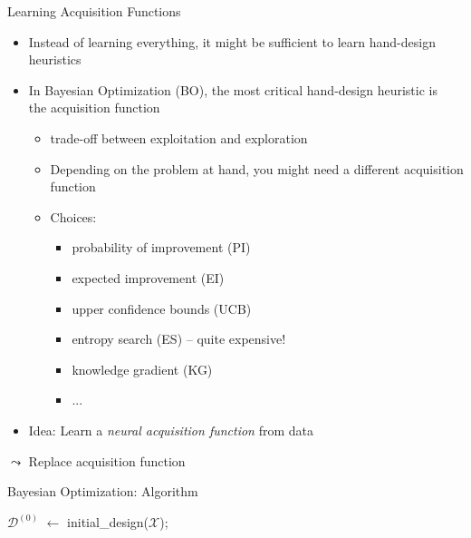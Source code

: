 \begin{frame}[c, fragile]{Learning Acquisition Functions }

\begin{itemize}
\item Instead of learning everything, it might be sufficient to \alert{learn hand-design heuristics}
\pause
\item In Bayesian Optimization (BO), the most critical hand-design heuristic is\\ the acquisition function
\begin{itemize}
\item trade-off between exploitation and exploration
\item Depending on the problem at hand, you might need a different acquisition function
\pause
\item Choices:
\begin{itemize}
\item probability of improvement (PI)
\item expected improvement (EI)
\item upper confidence bounds (UCB)
\item entropy search (ES) -- quite expensive!
\item knowledge gradient (KG)
\item ...
\end{itemize} 
\end{itemize}
\pause
\item \alert{Idea:} Learn a \emph{neural acquisition function} from data
\end{itemize}

$\leadsto$ Replace acquisition function 

\end{frame}
\begin{frame}[c,fragile]{Bayesian Optimization: Algorithm}

\begin{algorithm}[H]
\BlankLine
$\mathcal{D}^{(0)}$ $\leftarrow$ initial\_design($\mathcal{X}$); \\
\caption{Bayesian Optimization (BO)}
\end{algorithm}


\end{frame}
